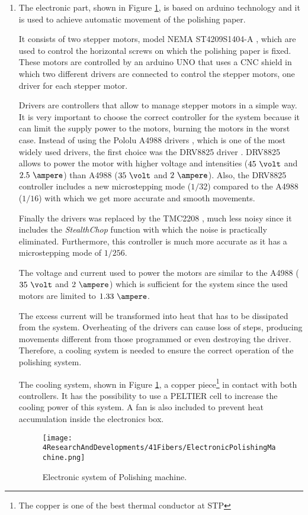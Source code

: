\begin{enumerate}
\item{} The electronic part, shown in Figure \ref{fig:ElectronicSystemPolishingMachine}, is based on arduino technology and it is used to achieve automatic movement of the polishing paper.

It consists of two stepper motors, model NEMA ST4209S1404-A \cite{StepperMotors}, which are used to control the horizontal screws on which the polishing paper is fixed. These motors are controlled by an arduino UNO \cite{ArduinoUNO} that uses a CNC shield \cite{CNCShield} in which two different drivers are connected to control the stepper motors, one driver for each stepper motor.

Drivers are controllers that allow to manage stepper motors in a simple way. It is very important to choose the correct controller for the system because it can limit the supply power to the motors, burning the motors in the worst case. Instead of using the Pololu A4988 drivers \cite{A4988Driver}, which is one of the most widely used drivers, the first choice was the DRV8825 driver \cite{DRV8825Driver}. DRV8825 allows to power the motor with higher voltage and intensities ($45~\volt$ and $2.5~\ampere$) than A4988 ($35~\volt$ and $2~\ampere$). Also, the DRV8825 controller includes a new microstepping mode ($1/32$) compared to the A4988 ($1/16$) with which we get more accurate and smooth movements.

Finally the drivers was replaced by the TMC2208 \cite{TMC2208Driver}, much less noisy since it includes the \textit{StealthChop} function with which the noise is practically eliminated. Furthermore, this controller is much more accurate as it has a microstepping mode of $1/256$.

The voltage and current used to power the motors are similar to the A4988 ($35~\volt$ and $2~\ampere$) which is sufficient for the system since the used motors are limited to $1.33~\ampere$. 

The excess current will be transformed into heat that has to be dissipated from the system. Overheating of the drivers can cause loss of steps, producing movements different from those programmed or even destroying the driver. Therefore, a cooling system is needed to ensure the correct operation of the polishing system.

The cooling system, shown in Figure \ref{fig:ElectronicSystemPolishingMachine}, a copper piece\footnote{The copper is one of the best thermal conductor at STP} in contact with both controllers. It has the possibility to use a PELTIER cell to increase the cooling power of this system. A fan is also included to prevent heat accumulation inside the electronics box.

\begin{figure}[h]
\centering
\texttt{[image: 4ResearchAndDevelopments/41Fibers/ElectronicPolishingMachine.png]}
\caption{Electronic system of Polishing machine.\label{fig:ElectronicSystemPolishingMachine}}
\end{figure}

\end{enumerate}

